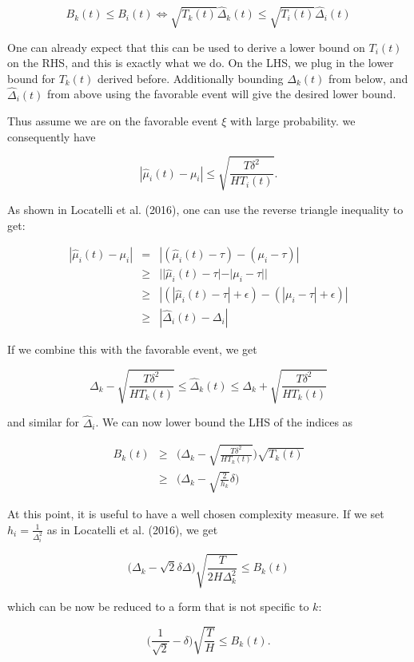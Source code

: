 \documentclass[12pt,]{article}
\begin{document}
\[
B_k(t) \leq B_i(t) \Leftrightarrow \sqrt{T_k(t)}\hat{\Delta}_k(t) \leq \sqrt{T_i(t)} \hat{\Delta}_i(t)
\]

One can already expect that this can be used to derive a lower bound on
\(T_i(t)\) on the RHS, and this is exactly what we do. On the LHS, we
plug in the lower bound for \(T_k(t)\) derived before. Additionally
bounding \(\Delta_k(t)\) from below, and \(\hat{\Delta}_i(t)\) from
above using the favorable event will give the desired lower bound.

Thus assume we are on the favorable event \(\xi\) with large
probability. we consequently have

\[
| \hat{\mu}_i(t) - \mu_i| \leq \sqrt{\frac{T\delta^2}{HT_i(t)}}.
\]

As shown in Locatelli et al. (2016), one can use the reverse triangle
inequality to get:

\begin{align*}
|\hat{\mu}_i(t) - \mu_i| & = & |(\hat{\mu}_i(t) - \tau) - (\mu_i - \tau)| \\
& \geq & || \hat{\mu}_i(t) - \tau | - |\mu_i - \tau|| \\
& \geq & |(|\hat{\mu}_i(t) - \tau| + \epsilon) - (|\mu_i - \tau| + \epsilon)| \\
& \geq & |\hat{\Delta}_i(t) - \Delta_i|
\end{align*}

If we combine this with the favorable event, we get

\[
\Delta_k - \sqrt{\frac{T\delta^2}{HT_k(t)}} \leq \hat{\Delta}_k(t) \leq \Delta_k + \sqrt{\frac{T\delta^2}{HT_k(t)}}
\]

and similar for \(\hat{\Delta}_i\). We can now lower bound the LHS of
the indices as

\begin{align*}
B_k(t) & \geq & \Big(\Delta_k - \sqrt{\frac{T\delta^2}{HT_k(t)}}\Big) \sqrt{T_k(t)} \\
& \geq & \Big(\Delta_k - \sqrt{\frac{2}{h_k}}\delta \Big)
\end{align*}

At this point, it is useful to have a well chosen complexity measure. If
we set \(h_i = \frac{1}{\Delta_i^2}\) as in Locatelli et al. (2016), we
get

\[
\Big(\Delta_k - \sqrt{2}\delta \Delta \Big) \sqrt{\frac{T}{2H\Delta_k^2}} \leq B_k(t)
\]

which can be now be reduced to a form that is not specific to \(k\):

\[
\Big( \frac{1}{\sqrt{2}} - \delta \Big) \sqrt{\frac{T}{H}} \leq B_k(t).
\]
\end{document}
